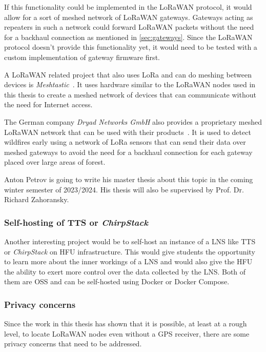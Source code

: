 If this functionality could be implemented in the \ac{LoRaWAN} protocol, it would allow for a sort of meshed network of \ac{LoRaWAN} gateways.
Gateways acting as repeaters in such a network could forward \ac{LoRaWAN} packets without the need for a backhaul connection as mentioned in \cref{sec:gateways}.
Since the \ac{LoRaWAN} protocol doesn't provide this functionality yet, it would need to be tested with a custom implementation of gateway firmware first.

A \ac{LoRaWAN} related project that also uses \ac{LoRa} and can do meshing between devices is \emph{Meshtastic}~\cite{meshtastic_llc_meshtastic_2023}.
It uses hardware similar to the \ac{LoRaWAN} nodes used in this thesis to create a meshed network of devices that can communicate without the need for Internet access.

The German company \emph{Dryad Networks GmbH} also provides a proprietary meshed \ac{LoRaWAN} network that can be used with their products~\cite{dryad_networks_gmbh_silvanet_2023}.
It is used to detect wildfires early using a network of \ac{LoRa} sensors that can send their data over meshed gateways to avoid the need for a backhaul connection for each gateway placed over large areas of forest.

Anton Petrov is going to write his master thesis about this topic in the coming winter semester of 2023/2024.
His thesis will also be supervised by Prof. Dr. Richard Zahoransky.

\subsubsection{Self-hosting of \acs{TTS} or \emph{ChirpStack}}

Another interesting project would be to self-host an instance of a \ac{LNS} like \ac{TTS} or \emph{ChirpStack} on \ac{HFU} infrastructure.
This would give students the opportunity to learn more about the inner workings of a \ac{LNS} and would also give the \ac{HFU} the ability to exert more control over the data collected by the \ac{LNS}.
Both of them are \ac{OSS} and can be self-hosted using Docker or Docker Compose.

\subsubsection{Privacy concerns}

Since the work in this thesis has shown that it is possible, at least at a rough level, to locate \ac{LoRaWAN} nodes even without a \ac{GPS} receiver, there are some privacy concerns that need to be addressed.

